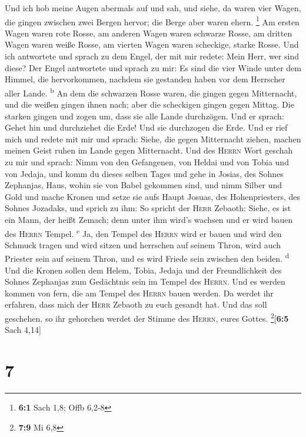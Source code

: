  Und ich hob meine Augen abermals auf und sah, und siehe,
da waren vier Wagen, die gingen zwischen zwei Bergen hervor; die Berge
aber waren ehern. \footnote{\textbf{6:1} Sach 1,8; Offb 6,2-8}
 Am ersten Wagen waren rote Rosse, am anderen Wagen waren
schwarze Rosse,  am dritten Wagen waren weiße Rosse, am
vierten Wagen waren scheckige, starke Rosse.  Und ich
antwortete und sprach zu dem Engel, der mit mir redete: Mein Herr, wer
sind diese?  Der Engel antwortete und sprach zu mir: Es
sind die vier Winde unter dem Himmel, die hervorkommen, nachdem sie
gestanden haben vor dem Herrscher aller Lande. \textsuperscript{b}
 An dem die schwarzen Rosse waren, die gingen gegen
Mitternacht, und die weißen gingen ihnen nach; aber die scheckigen
gingen gegen Mittag.  Die starken gingen und zogen um,
dass sie alle Lande durchzögen. Und er sprach: Gehet hin und durchziehet
die Erde! Und sie durchzogen die Erde.  Und er rief mich
und redete mit mir und sprach: Siehe, die gegen Mitternacht ziehen,
machen meinen Geist ruhen im Lande gegen Mitternacht.  Und
des \textsc{Herrn} Wort geschah zu mir und sprach:  Nimm
von den Gefangenen, von Heldai und von Tobia und von Jedaja, und komm du
dieses selben Tages und gehe in Josias, des Sohnes Zephanjas, Haus,
wohin sie von Babel gekommen sind,  und nimm Silber und
Gold und mache Kronen und setze sie aufs Haupt Josuas, des
Hohenpriesters, des Sohnes Jozadaks,  und sprich zu ihm:
So spricht der \textsc{Herr} Zebaoth: Siehe, es ist ein Mann, der heißt
Zemach; denn unter ihm wird's wachsen und er wird bauen des
\textsc{Herrn} Tempel. \textsuperscript{c}  Ja, den
Tempel des \textsc{Herrn} wird er bauen und wird den Schmuck tragen und
wird sitzen und herrschen auf seinem Thron, wird auch Priester sein auf
seinem Thron, und es wird Friede sein zwischen den beiden.
\textsuperscript{d}  Und die Kronen sollen dem Helem,
Tobia, Jedaja und der Freundlichkeit des Sohnes Zephanjas zum Gedächtnis
sein im Tempel des \textsc{Herrn}.  Und es werden kommen
von fern, die am Tempel des \textsc{Herrn} bauen werden. Da werdet ihr
erfahren, dass mich der \textsc{Herr} Zebaoth zu euch gesandt hat. Und
das soll geschehen, so ihr gehorchen werdet der Stimme des
\textsc{Herrn}, eures Gottes. \footnote{\textbf{7:9} Mi 6,8}{[}\textbf{6:5}
Sach 4,14{]}

\hypertarget{section-6}{%
\section{7}\label{section-6}}


